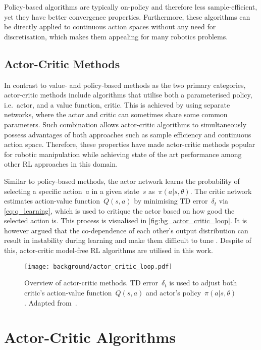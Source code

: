 Policy-based algorithms are typically on-policy and therefore less sample-efficient, yet they have better convergence properties. Furthermore, these algorithms can be directly applied to continuous action spaces without any need for discretisation, which makes them appealing for many robotics problems.


\subsection{Actor-Critic Methods}

In contrast to value- and policy-based methods as the two primary categories, actor-critic methods include algorithms that utilise both a parameterised policy, i.e.~actor, and a value function, critic. This is achieved by using separate networks, where the actor and critic can sometimes share some common parameters. Such combination allows actor-critic algorithms to simultaneously possess advantages of both approaches such as sample efficiency and continuous action space. Therefore, these properties have made actor-critic methods popular for robotic manipulation while achieving state of the art performance among other RL approaches in this domain.

Similar to policy-based methods, the actor network learns the probability of selecting a specific action~\(a\) in a given state~\(s\) as~\(\pi(a \vert s, \theta)\). The critic network estimates action-value function~\(Q(s, a)\) by minimising TD error~\(\delta_{t}\) via \autoref{eq:q_learning}, which is used to critique the actor based on how good the selected action is. This process is visualised in \autoref{fig:bg_actor_critic_loop}. It is however argued that the co-dependence of each other's output distribution can result in instability during learning and make them difficult to tune \cite{quillen_deep_2018}. Despite of this, actor-critic model-free RL algorithms are utilised in this work.

\begin{figure}[ht]
    \centering
    \texttt{[image: background/actor\_critic\_loop.pdf]}
    \caption{Overview of actor-critic methods. TD error~\(\delta_{t}\) is used to adjust both critic's action-value function~\(Q(s, a)\) and actor's policy~\(\pi(a \vert s, \theta)\). Adapted from~\protect\citet{sutton_reinforcement_2018}.}
    \label{fig:bg_actor_critic_loop}
\end{figure}


\section{Actor-Critic Algorithms}\label{sec:bg_actor_critic_algorithms}


